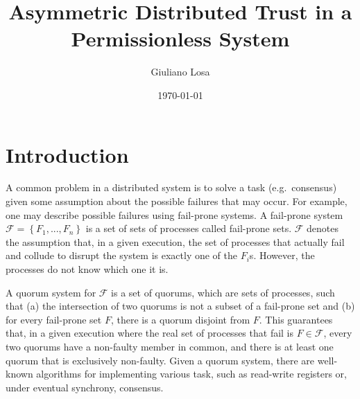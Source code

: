 \documentclass[11pt]{article}
\title{Asymmetric Distributed Trust in a Permissionless System}
\date{\today}
\author{Giuliano Losa}
\begin{document}
\maketitle


\section{Introduction}


A common problem in a distributed system is to solve a task (e.g.\ consensus) given some assumption about the possible failures that may occur. For example, one may describe possible failures using fail-prone systems. A fail-prone system $\mathcal{F}=\left\{F_1,...,F_n\right\}$ is a set of sets of processes called fail-prone sets. $\mathcal{F}$ denotes the assumption that, in a given execution, the set of processes that actually fail and collude to disrupt the system is exactly one of the $F_i$s. However, the processes do not know which one it is.

A quorum system for $\mathcal{F}$ is a set of quorums, which are sets of processes, such that (a) the intersection of two quorums is not a subset of a fail-prone set and (b) for every fail-prone set $F$, there is a quorum disjoint from $F$. This guarantees that, in a given execution where the real set of processes that fail is $F\in\mathcal{F}$, every two quorums have a non-faulty member in common, and there is at least one quorum that is exclusively non-faulty. Given a quorum system, there are well-known algorithms for implementing various task, such as read-write registers or, under eventual synchrony, consensus.
\end{document}
